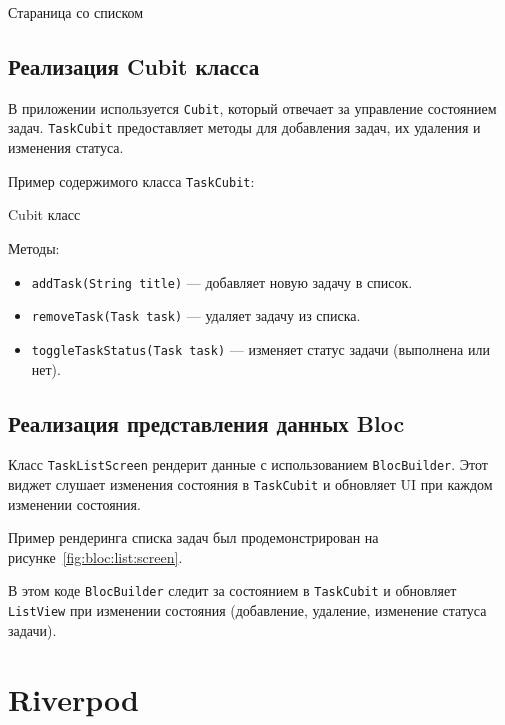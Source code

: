 \begin{image}
	\caption{Стараница со списком}
	\label{fig:bloc:list:show}
\end{image}

\subsection{Реализация Cubit класса}

В приложении используется \texttt{Cubit},
который отвечает за управление состоянием задач.
\texttt{TaskCubit} предоставляет методы для добавления задач,
их удаления и изменения статуса.

Пример содержимого класса \texttt{TaskCubit}:

\begin{image}
	\caption{Cubit класс}
	\label{fig:bloc:cubit}
\end{image}

Методы:

\begin{itemize}
	\item \texttt{addTask(String title)} --- добавляет новую задачу в список.
	\item \texttt{removeTask(Task task)} --- удаляет задачу из списка.
	\item \texttt{toggleTaskStatus(Task task)} --- изменяет статус задачи
		(выполнена или нет).
\end{itemize}

\subsection{Реализация представления данных Bloc}

Класс \texttt{TaskListScreen} рендерит данные
с использованием \texttt{BlocBuilder}.
Этот виджет слушает изменения состояния в \texttt{TaskCubit}
и обновляет UI при каждом изменении состояния.

Пример рендеринга списка задач был продемонстрирован
на рисунке~\ref{fig:bloc:list:screen}.

В этом коде \texttt{BlocBuilder} следит за состоянием в \texttt{TaskCubit}
и обновляет \texttt{ListView} при изменении состояния
(добавление, удаление, изменение статуса задачи).

\clearpage

\section{Riverpod}

